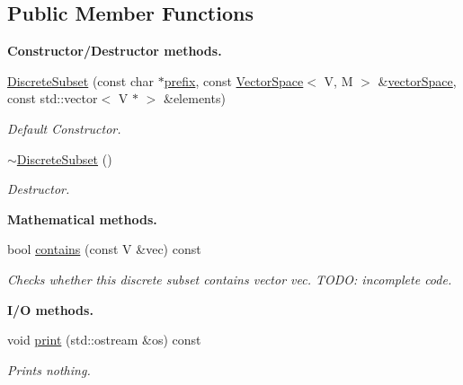 \subsection*{Public Member Functions}
\begin{Indent}{\bf Constructor/\-Destructor methods.}\par
\begin{DoxyCompactItemize}
\item 
\hyperlink{class_q_u_e_s_o_1_1_discrete_subset_a4fa2c637451907495db05227d0a03be3}{Discrete\-Subset} (const char $\ast$\hyperlink{class_q_u_e_s_o_1_1_vector_set_aedcd4b0f502af4c6e6df863c13cddfec}{prefix}, const \hyperlink{class_q_u_e_s_o_1_1_vector_space}{Vector\-Space}$<$ V, M $>$ \&\hyperlink{class_q_u_e_s_o_1_1_vector_subset_afc859b5206bc056c66893c854c191959}{vector\-Space}, const std\-::vector$<$ V $\ast$ $>$ \&elements)
\begin{DoxyCompactList}\small\item\em Default Constructor. \end{DoxyCompactList}\item 
\hyperlink{class_q_u_e_s_o_1_1_discrete_subset_a25e1e72e0dccf88a12d3a736957a1f75}{$\sim$\-Discrete\-Subset} ()
\begin{DoxyCompactList}\small\item\em Destructor. \end{DoxyCompactList}\end{DoxyCompactItemize}
\end{Indent}
\begin{Indent}{\bf Mathematical methods.}\par
\begin{DoxyCompactItemize}
\item 
bool \hyperlink{class_q_u_e_s_o_1_1_discrete_subset_a08781b67f177ffd3e64b25df12a51958}{contains} (const V \&vec) const 
\begin{DoxyCompactList}\small\item\em Checks whether this discrete subset contains vector {\ttfamily vec}. T\-O\-D\-O\-: incomplete code. \end{DoxyCompactList}\end{DoxyCompactItemize}
\end{Indent}
\begin{Indent}{\bf I/\-O methods.}\par
\begin{DoxyCompactItemize}
\item 
void \hyperlink{class_q_u_e_s_o_1_1_discrete_subset_ae4ead967806ac7c1a7502f4a07f3e05a}{print} (std\-::ostream \&os) const 
\begin{DoxyCompactList}\small\item\em Prints nothing. \end{DoxyCompactList}\end{DoxyCompactItemize}
\end{Indent}
